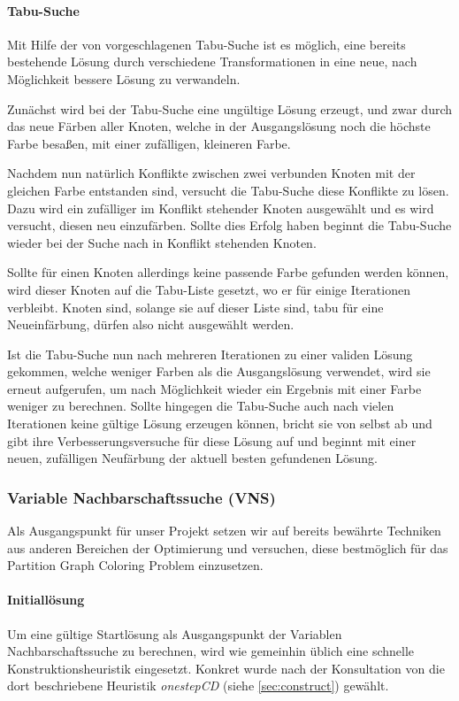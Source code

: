 \documentclass[paper=a4,fontsize=12pt]{scrartcl}
\begin{document}
\paragraph{Tabu-Suche}{
Mit Hilfe der von \citet*{Noronha2006} vorgeschlagenen Tabu-Suche ist es möglich, eine bereits bestehende Lösung durch verschiedene Transformationen in eine neue, nach Möglichkeit bessere Lösung zu verwandeln.

Zunächst wird bei der Tabu-Suche eine ungültige Lösung erzeugt, und zwar durch das neue Färben aller Knoten, welche in der Ausgangslösung noch die höchste Farbe besaßen, mit einer zufälligen, kleineren Farbe.

Nachdem nun natürlich Konflikte zwischen zwei verbunden Knoten mit der gleichen Farbe entstanden sind, versucht die Tabu-Suche diese Konflikte zu lösen. Dazu wird ein zufälliger im Konflikt stehender Knoten ausgewählt und es wird versucht, diesen neu einzufärben. Sollte dies Erfolg haben beginnt die Tabu-Suche wieder bei der Suche nach in Konflikt stehenden Knoten.

Sollte für einen Knoten allerdings keine passende Farbe gefunden werden können, wird dieser Knoten auf die Tabu-Liste gesetzt, wo er für einige Iterationen verbleibt. Knoten sind, solange sie auf dieser Liste sind, tabu für eine Neueinfärbung, dürfen also nicht ausgewählt werden.

Ist die Tabu-Suche nun nach mehreren Iterationen zu einer validen Lösung gekommen, welche weniger Farben als die Ausgangslösung verwendet, wird sie erneut aufgerufen, um nach Möglichkeit wieder ein Ergebnis mit einer Farbe weniger zu berechnen.
Sollte hingegen die Tabu-Suche auch nach vielen Iterationen keine gültige Lösung erzeugen können, bricht sie von selbst ab und gibt ihre Verbesserungsversuche für diese Lösung auf und beginnt mit einer neuen, zufälligen Neufärbung der aktuell besten gefundenen Lösung.}

\subsubsection{Variable Nachbarschaftssuche (VNS)}
Als Ausgangspunkt für unser Projekt setzen wir auf bereits bewährte Techniken aus anderen Bereichen der Optimierung und versuchen, diese bestmöglich für das Partition Graph Coloring Problem einzusetzen.

\paragraph{Initiallösung}{
Um eine gültige Startlösung als Ausgangspunkt der Variablen Nachbarschaftssuche zu berechnen, wird wie gemeinhin üblich eine schnelle Konstruktionsheuristik eingesetzt. Konkret wurde nach der Konsultation von \citet*{Li2000} die dort beschriebene Heuristik \emph{onestepCD} (siehe \ref{sec:construct}) gewählt.}
\end{document}
